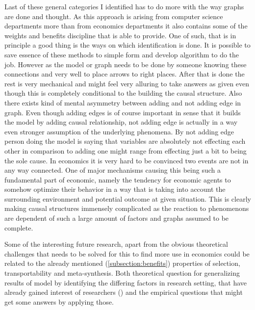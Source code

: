 \documentclass[main=english,12pt,a4paper,pdftex,econ,utf8]{aaltothesis}
\begin{document}
Last of these general categories I identified has to do more with the way graphs are done and thought. As this approach is arising from computer science departments more than from economics departments it also contains some of the weights and benefits discipline that is able to provide. One of such, that is in principle a good thing is the ways on which identification is done. It is possible to save essence of these methods to simple form and develop algorithm to do the job. However as the model or graph needs to be done by someone knowing these connections and very well to place arrows to right places. After that is done the rest is very mechanical and might feel very alluring to take answers as given even though this is completely conditional to the building the causal structure. Also there exists kind of mental asymmetry between adding and not adding edge in graph. Even though adding edges is of course important in sense that it builds the model by adding causal relationship, not adding edge is actually in a way even stronger assumption of the underlying phenomena. By not adding edge person doing the model is saying that variables are absolutely not effecting each other in comparison to adding one might range from effecting just a bit to being the sole cause. In economics it is very hard to be convinced two events are not in any way connected. One of major mechanisms causing this being such a fundamental part of economic, namely the tendency for economic agents to somehow optimize their behavior in a way that is taking into account the surrounding environment and potential outcome at given situation. This is clearly making causal structures immensely complicated as the reaction to phenomenons are dependent of such a large amount of factors and graphs assumed to be complete.

Some of the interesting future research, apart from the obvious theoretical challenges that needs to be solved for this to find more use in economics could be related to the already mentioned (\ref{subsection:benefits}) properties of selection, transportability and meta-synthesis. Both theoretical question for generalizing results of model by identifying the differing factors in research setting, that have already gained interest of researchers (\cite{Cinelli2021}) and the empirical questions that might get some answers by applying those.
\end{document}
